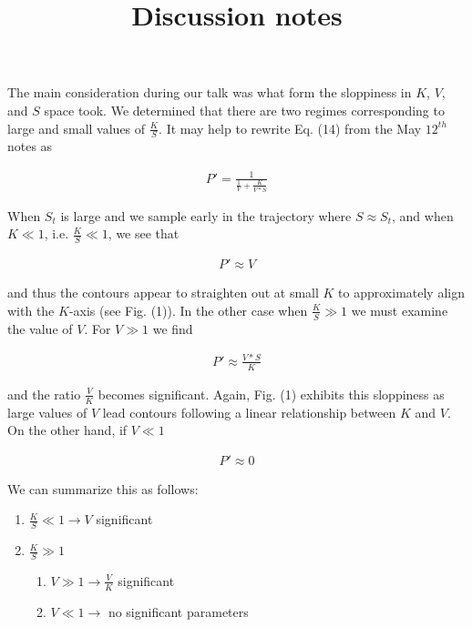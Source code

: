 \documentclass[11pt]{article}
\title{Discussion notes}
\begin{document}
\maketitle

The main consideration during our talk was what form the sloppiness in $K$, $V$, and $S$ space took. We determined that there are two regimes corresponding to large and small values of $\frac{K}{S}$. It may help to rewrite Eq. (14) from the May $12^{th}$ notes as

\begin{align*}
  P' = \frac{1}{\frac{1}{V} + \frac{K}{V*S}}
\end{align*}

When $S_t$ is large and we sample early in the trajectory where $S \approx S_t$, and when $K \ll 1$, i.e. $\frac{K}{S} \ll 1$, we see that

\begin{align*}
  P' \approx V
\end{align*}

and thus the contours appear to straighten out at small $K$ to approximately align with the $K$-axis (see Fig. (1)). In the other case when $\frac{K}{S} \gg 1$ we must examine the value of $V$. For $V \gg 1$ we find

\begin{align*}
  P' \approx \frac{V*S}{K}
\end{align*}

and the ratio $\frac{V}{K}$ becomes significant. Again, Fig. (1) exhibits this sloppiness as large values of $V$ lead contours following a linear relationship between $K$ and $V$. On the other hand, if $V \ll 1$

\begin{align*}
  P' \approx 0
\end{align*}

We can summarize this as follows:

\begin{enumerate}
\item $\frac{K}{S} \ll 1 \rightarrow V$ significant
\item $\frac{K}{S} \gg 1$
  \begin{enumerate}
  \item $V \gg 1 \rightarrow \frac{V}{K}$ significant
  \item $V \ll 1 \rightarrow$ no significant parameters
  \end{enumerate}
\end{enumerate}
\end{document}
